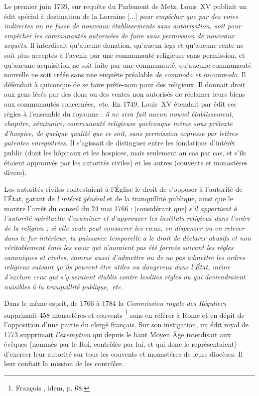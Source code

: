  Le premier juin 1739, sur requête du Parlement de Metz, Louis~XV publiait un édit spécial à destination de la Lorraine {[...] \emph{pour empêcher que par des voies indirectes on ne fasse de nouveaux établissements sans autorisation, soit pour empêcher les communautés autorisées de faire sans permission de nouveaux acquêts}}. Il interdisait qu'aucune donation, qu'aucun legs et qu'aucune rente ne soit plus acceptés à l'avenir par une communauté religieuse sans permission, et qu'aucune acquisition ne soit faite par une communauté, qu'aucune communauté nouvelle ne soit créée sans une enquête préalable \emph{de commodo et incommodo}. Il défendait à quiconque de se faire prête-nom pour des religieux. Il donnait droit aux gens lésés par des dons ou des ventes non autorisés de réclamer leurs biens aux communautés concernées,~etc. En 1749, Louis~XV étendait par édit ces règles à l'ensemble du royaume : \emph{il ne sera fait aucun nouvel établissement, chapitre, séminaire, communauté religieuse quelconque même sous prétexte d'hospice, de quelque qualité que ce soit, sans permission expresse par lettres patentes enregistrées}. Il s'agissait de distinguer entre les fondations d'intérêt public (dont les hôpitaux et les hospices, mais seulement au cas par cas, et s'ils étaient approuvés par les autorités civiles) et les autres (couvents et monastères divers). 

 Les autorités civiles contestaient à l'Église le droit de s'opposer à l'autorité de l'État, garant de \emph{l'intérêt général} et de la tranquillité publique, ainsi que le montre l'arrêt du conseil du 24 mai 1766 : [considérant que] \emph{s'il appartient à l'autorité spirituelle d'examiner et d'approuver les instituts religieux dans l'ordre de la religion ; si elle seule peut consacrer les vœux, en dispenser ou en relever dans le for intérieur, la puissance temporelle a le droit de déclarer abusifs et non véritablement émis les vœux qui n'auraient pas été formés suivant les règles canoniques et civiles, comme aussi d'admettre ou de ne pas admettre les ordres religieux suivant qu'ils peuvent être utiles ou dangereux dans l'État, même d'exclure ceux qui s'y seraient établis contre lesdites règles ou qui deviendraient nuisibles à la tranquillité publique,~etc.}

 Dans le même esprit, de 1766 à 1784 la \emph{Commission royale des Réguliers} supprimait 458 monastères et couvents%
\footnote{François , idem, p. 68.} 
sans en référer à Rome et en dépit de l'opposition d'une partie du clergé français. Sur son instigation, un édit royal de 1773 supprimait \emph{l'exemption} qui depuis le haut Moyen Âge interdisait aux évêques (nommés par le Roi, contrôlés par lui, et qui donc le représentaient) d'exercer leur autorité sur tous les couvents et monastères de leurs diocèses. Il leur confiait la mission de les contrôler. 

